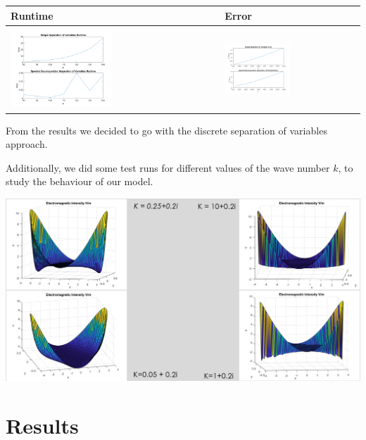 \documentclass[11pt]{article}
\begin{document}
\begin{longtable}[]{@{}ll@{}}
\toprule
Runtime & Error \\
\midrule
\endhead
& \\
\includegraphics[width=0.5\textwidth]{runtime_dif.png} & \includegraphics[width=0.5\textwidth]{error_dif.png}\\
\bottomrule
\end{longtable}

\newpage
From the results we decided to go with the discrete separation of
variables approach.

Additionally, we did some test runs for different values of the wave
number \(k\), to study the behaviour of our model.

\includegraphics[width=\linewidth]{kvalsellip.png}

\section{Results}
\end{document}
